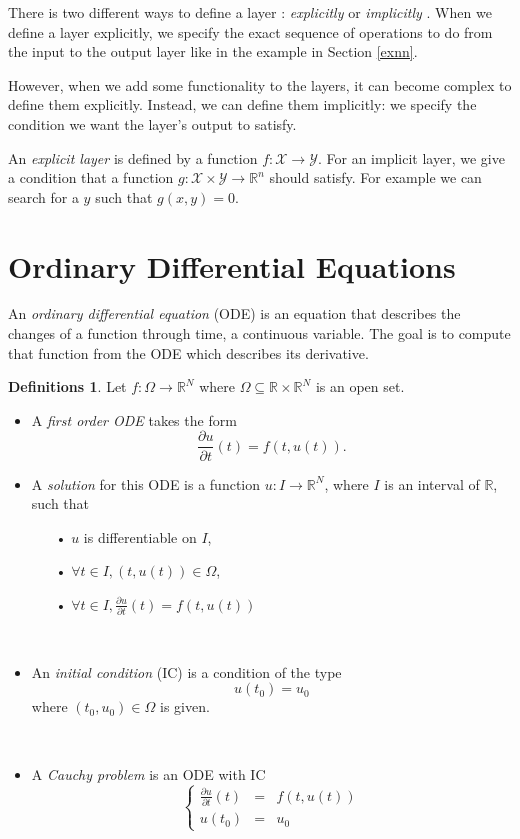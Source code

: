 \documentclass[10pt,a4paper]{article}
\theoremstyle{definition}
\newtheorem{defs}{Definitions}
\theoremstyle{plain}
\begin{document}
There is two different ways to define a layer : \textit{explicitly} or \textit{implicitly} \cite{2}. When we define a layer explicitly, we specify the exact sequence of operations to do from the input to the output layer like in the example in Section \ref{exnn}. 

However, when we add some functionality to the layers, it can become complex to define them explicitly. Instead, we can define them implicitly: we specify the condition we want the layer's output to satisfy. 

An \textit{explicit layer} is defined by a function $f : \mathcal{X} \rightarrow \mathcal{Y}$. For an implicit layer, we give a condition that a function $g: \mathcal{X} \times \mathcal{Y} \rightarrow \mathbb{R}^n$ should satisfy. For example we can search for a $y$ such that $g(x,y) = 0$.


\section{Ordinary Differential Equations}

An\textit{ ordinary differential equation} (ODE) \cite{9} is an equation that describes the changes of a function through time, a continuous variable. The goal is to compute that function from the ODE which describes its derivative.

\begin{defs}
Let $f: \Omega \rightarrow \mathbb{R}^N$ where $\Omega \subseteq \mathbb{R} \times \mathbb{R}^N$ is an open set. 

\begin{itemize}
\item A \textit{first order ODE} takes the form
$$
\frac{\partial u}{\partial t}(t) = f(t,u(t)).
$$

\item A \textit{solution} for this ODE is a function $u : I \rightarrow \mathbb{R}^N$, where $I$ is an interval of $\mathbb{R}$, such that
	\begin{itemize}
	\item[•] $u$ is differentiable on $I$,
	\item[•] $\forall t \in I, (t, u(t)) \in \Omega$,
	\item[•] $\forall t \in I, \frac{\partial u}{\partial t}(t) = f(t, u(t))$
	\end{itemize}
~

\item An \textit{initial condition} (IC) is a condition of the type
$$
u(t_0) = u_0
$$
where $(t_0, u_0) \in \Omega$ is given.

~

\item A \textit{Cauchy problem} is an ODE with IC
$$
\left \{
\begin{array}{rcl}
\frac{\partial u}{\partial t}(t) & = & f(t, u(t)) \\
u(t_0) & = & u_0
\end{array}
\right.
$$
\end{itemize}
\end{defs}
\end{document}
